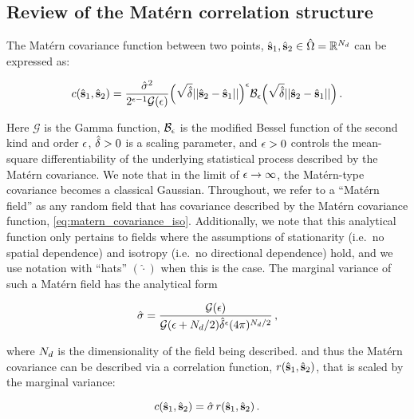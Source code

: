 \subsection{Review of the Mat\'ern correlation structure}
\label{ssec:matern_review}

The Mat\'ern covariance function between two points, $\hat{\mathbf{s}}_1,\hat{\mathbf{s}}_2\in\hat{\Omega} =
\mathbb{R}^{N_{d}}$ can be expressed as:
\begin{linenomath*}\begin{equation}
    c(\hat{\mathbf{s}}_1,\hat{\mathbf{s}}_2) = \dfrac{\hat{\sigma}^2}{2^{\epsilon-1}
    \mathcal{G}(\epsilon)}
    \Big(\sqrt{\hat{\delta}} ||\hat{\mathbf{s}}_2-\hat{\mathbf{s}}_1||\Big)^{\epsilon}
    \mathcal{B}_{\epsilon}
    \Big(\sqrt{\hat{\delta}} ||\hat{\mathbf{s}}_2-\hat{\mathbf{s}}_1||\Big) \, .
    \label{eq:matern_covariance_iso}
\end{equation}\end{linenomath*}
Here
$\mathcal{G}$ is the Gamma function,
$\mathcal{B}_{\epsilon}$ is the modified
Bessel function of the second kind and order $\epsilon$,
$\hat{\delta}>0$ is a scaling parameter, and $\epsilon>0$
controls the mean-square differentiability of the underlying statistical process
described by the Mat\'ern covariance.
We note that in the limit of $\epsilon\rightarrow\infty$, the Mat\'ern-type
covariance becomes a classical Gaussian.
Throughout, we refer to a ``Mat\'ern field'' as any random field that has
covariance described by the Mat\'ern covariance function,
\cref{eq:matern_covariance_iso}.
Additionally, we note that this analytical function only pertains to fields where the
assumptions of stationarity (i.e.\ no spatial dependence) and isotropy (i.e.\ no
directional dependence) hold, and we use notation with ``hats'' $(\hat{\cdot})$
when this is the case.
The marginal variance of such a Mat\'ern field has the analytical form
\begin{linenomath*}\begin{equation}
    \hat{\sigma} = \dfrac{\mathcal{G}(\epsilon)}{
        \mathcal{G}(\epsilon + N_{d}/2)
        \hat{\delta}^{\epsilon}
        (4\pi)^{N_{d}/2}
    } \, ,
    \label{eq:matern_variance}
\end{equation}\end{linenomath*}
where $N_{d}$ is the dimensionality of the field being described.
and thus the Mat\'ern covariance can be described via a correlation
function, $r(\hat{\mathbf{s}}_1, \hat{\mathbf{s}}_2)$, that is scaled by the marginal variance:
\begin{linenomath*}\begin{equation*}
    c(\hat{\mathbf{s}}_1, \hat{\mathbf{s}}_2) = \hat{\sigma}\,r(\hat{\mathbf{s}}_1, \hat{\mathbf{s}}_2) \, .
\end{equation*}\end{linenomath*}


